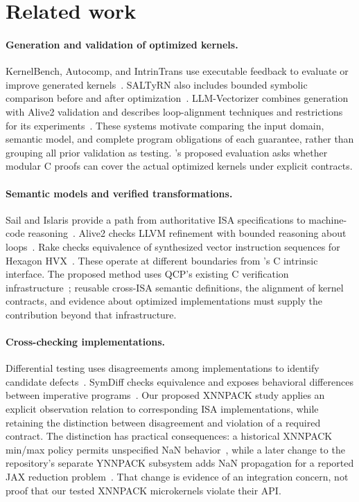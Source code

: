 \section{Related work}
\label{sec:related}

\paragraph*{Generation and validation of optimized kernels.}
KernelBench, Autocomp, and IntrinTrans use executable feedback to evaluate or improve generated kernels~\cite{kernelbench,autocomp,intrintrans}. SALTyRN also includes bounded symbolic comparison before and after optimization~\cite{saltyrn}. LLM-Vectorizer combines generation with Alive2 validation and describes loop-alignment techniques and restrictions for its experiments~\cite{llm-vectorizer}. These systems motivate comparing the input domain, semantic model, and complete program obligations of each guarantee, rather than grouping all prior validation as testing. \tool's proposed evaluation asks whether modular C proofs can cover the actual optimized kernels under explicit contracts.

\paragraph*{Semantic models and verified transformations.}
Sail and Islaris provide a path from authoritative ISA specifications to machine-code reasoning~\cite{sail,islaris}. Alive2 checks LLVM refinement with bounded reasoning about loops~\cite{alive2}. Rake checks equivalence of synthesized vector instruction sequences for Hexagon HVX~\cite{rake}. These operate at different boundaries from \tool's C intrinsic interface. The proposed method uses QCP's existing C verification infrastructure~\cite{qcp}; reusable cross-ISA semantic definitions, the alignment of kernel contracts, and evidence about optimized implementations must supply the contribution beyond that infrastructure.

\paragraph*{Cross-checking implementations.}
Differential testing uses disagreements among implementations to identify candidate defects~\cite{mckeeman}. SymDiff checks equivalence and exposes behavioral differences between imperative programs~\cite{symdiff}. Our proposed XNNPACK study applies an explicit observation relation to corresponding ISA implementations, while retaining the distinction between disagreement and violation of a required contract. The distinction has practical consequences: a historical XNNPACK min/max policy permits unspecified NaN behavior~\cite{xnn-nan-policy}, while a later change to the repository's separate YNNPACK subsystem adds NaN propagation for a reported JAX reduction problem~\cite{ynn-nan-fix}. That change is evidence of an integration concern, not proof that our tested XNNPACK microkernels violate their API.

